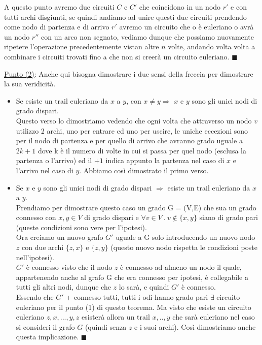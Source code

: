 \begin{demostration}
\begin{itemize}
    A questo punto avremo due circuiti $C$ e $C'$ che coincidono in un nodo $r'$ e con tutti archi disgiunti, se quindi andiamo ad unire questi due circuiti prendendo come nodo di partenza e di arrivo $r'$ avremo un circuito che o è euleriano o avrà un nodo $r''$ con un arco non segnato, vediamo dunque che possiamo nuovamente ripetere l'operazione precedentemente vistan altre $n$ volte, andando volta volta a combinare i circuiti trovati fino a che non si creerà un circuito euleriano. $\blacksquare$
\end{itemize}
\underline{Punto (2)}: Anche qui bisogna dimostrare i due sensi della freccia per dimostrare la sua veridicità.
\begin{itemize}
    \item Se esiste un trail euleriano da $x$ a $y$, con $x\neq y \Longrightarrow$ $x$ e $y$ sono gli unici nodi di grado dispari.\\
    Questo verso lo dimostriamo vedendo che ogni volta che attraverso un nodo $v$ utilizzo 2 archi, uno per entrare ed uno per uscire, le uniche eccezioni sono per il nodo di partenza e per quello di arrivo che avranno grado uguale a $2k + 1$ dove k è il numero di volte in cui si passa per quel nodo (esclusa la partenza o l'arrivo) ed il $+1$ indica appunto la partenza nel caso di $x$ e l'arrivo nel caso di $y$. Abbiamo così dimostrato il primo verso.
    \item Se $x$ e $y$ sono gli unici nodi di grado dispari $\Longrightarrow $ esiste un trail euleriano da $x$ a $y$.\\
    Prendiamo per dimostrare questo caso un grado G = (V,E) che sua un grado connesso con $x,y \in V$ di grado dispari e $\forall v \in V \:.\: v\notin \{x,y\}$ siano di grado pari (queste condizioni sono vere per l'ipotesi).\\
    Ora creiamo un nuovo grafo $G'$ uguale a G solo introducendo un nuovo nodo $z$ con due archi $\{z,x\}$ e $\{z,y\}$ (questo nuovo nodo rispetta le condizioni poste nell'ipotesi). \\
    $G'$ è connesso visto che il nodo $z$ è connesso ad almeno un nodo il quale, appartenendo anche al grafo G che era connesso per ipotesi, è collegabile a tutti gli altri nodi, dunque che $z$ lo sarà, e quindi $G'$ è connesso.\\
    Essendo che $G'$ + connesso tutti, tutti i odi hanno grado pari $\exists$ circuito euleriano per il punto (1) di questo teorema. Ma visto che esiste un circuito euleriano $z,x,...,y,z$ esisterà allora un trail $x,..,y$ che sarà euleriano nel caso si consideri il grafo $G$ (quindi senza $z$ e i suoi archi). Così dimostriamo anche questa implicazione. $\blacksquare$
\end{itemize}
\end{demostration}

